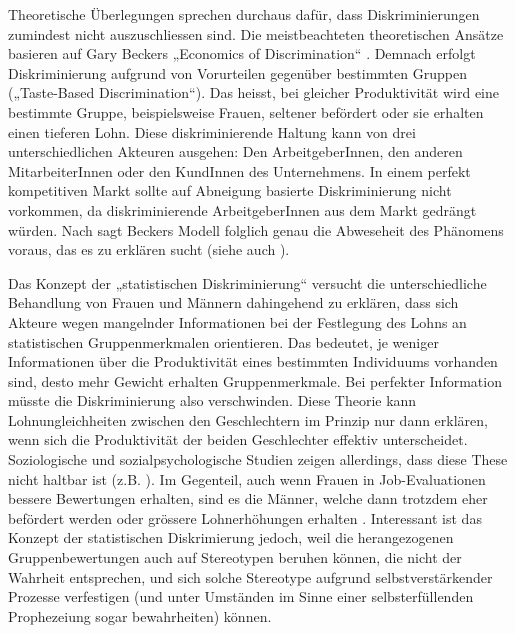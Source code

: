 \documentclass[a4paper,12pt]{article}
\begin{document}
Theoretische Überlegungen sprechen durchaus dafür, dass Diskriminierungen zumindest nicht auszuschliessen sind. Die meistbeachteten theoretischen Ansätze basieren auf Gary
Beckers „Economics of Discrimination“ \citep{Becker-1973}. Demnach erfolgt Diskriminierung aufgrund von Vorurteilen gegenüber bestimmten Gruppen („Taste-Based Discrimination“). Das heisst, bei gleicher Produktivität wird eine bestimmte Gruppe, beispielsweise Frauen, seltener befördert oder sie erhalten einen tieferen Lohn. Diese diskriminierende Haltung kann von drei unterschiedlichen Akteuren ausgehen: Den ArbeitgeberInnen, den anderen MitarbeiterInnen oder den KundInnen des Unternehmens. In einem perfekt kompetitiven Markt sollte auf Abneigung basierte Diskriminierung nicht vorkommen, da diskriminierende ArbeitgeberInnen aus dem Markt gedrängt würden. Nach \cite{Arrow-1972} sagt Beckers Modell folglich genau die Abweseheit des Phänomens voraus, das es zu erklären sucht (siehe auch  \citealp{Guryan-2013}).

Das Konzept der „statistischen Diskriminierung“ \citep{Arrow-1972,Phelps-1972} versucht
die unterschiedliche Behandlung von Frauen und Männern dahingehend zu erklären,
dass sich Akteure wegen mangelnder Informationen bei der Festlegung des Lohns
an statistischen Gruppenmerkmalen orientieren. Das bedeutet, je weniger Informationen über die Produktivität eines bestimmten Individuums vorhanden sind, desto mehr Gewicht erhalten Gruppenmerkmale. Bei perfekter Information müsste die Diskriminierung also verschwinden. Diese Theorie kann
Lohnungleichheiten zwischen den Geschlechtern im Prinzip nur dann erklären, wenn
sich die Produktivität der beiden Geschlechter effektiv unterscheidet. Soziologische und
sozialpsychologische Studien zeigen allerdings, dass diese These nicht haltbar
ist (z.B. \citealp{Bielby-Bielby-1988}). Im Gegenteil, auch wenn Frauen in
Job-Evaluationen bessere Bewertungen erhalten, sind es die Männer, welche dann
trotzdem eher befördert werden \citep{Blau-DeVaro-2007} oder grössere
Lohnerhöhungen erhalten \citep{Castilla-2012}. Interessant ist das Konzept der 
statistischen Diskrimierung jedoch, weil die herangezogenen Gruppenbewertungen auch auf 
Stereotypen beruhen können, die nicht der Wahrheit 
entsprechen, und sich solche Stereotype aufgrund selbstverstärkender Prozesse 
verfestigen (und unter Umständen im Sinne einer selbsterfüllenden Prophezeiung 
sogar bewahrheiten) können.
\end{document}
